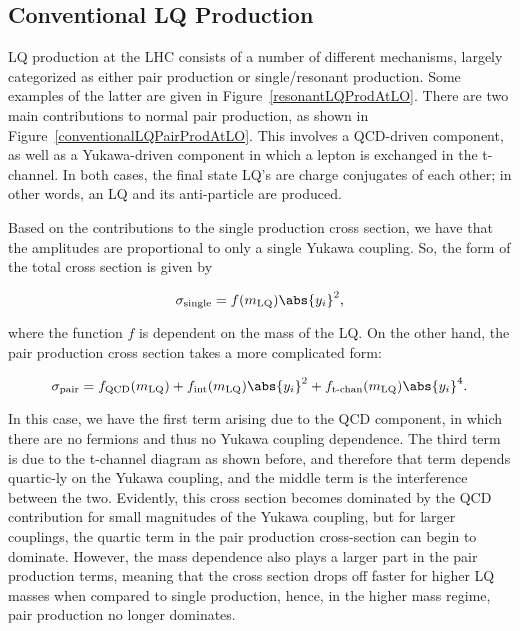     \subsection{Conventional LQ Production}

        

        LQ production at the LHC consists of a number of different mechanisms, largely categorized as either pair production or single/resonant production. Some examples of the latter are given in Figure~\ref{resonantLQProdAtLO}. There are two main contributions to normal pair production, as shown in Figure~\ref{conventionalLQPairProdAtLO}. This involves a QCD-driven component, as well as a Yukawa-driven component in which a lepton is exchanged in the t-channel. In both cases, the final state LQ's are charge conjugates of each other; in other words, an LQ and its anti-particle are produced. 

        

        Based on the contributions to the single production cross section, we have that the amplitudes are proportional to only a single Yukawa coupling. So, the form of the total cross section is given by

        \begin{equation}
            \sigma_{\text{single}} = f(m_{\text{LQ}}) \abs{y_i}^2,
        \end{equation}

        where the function $f$ is dependent on the mass of the LQ. On the other hand, the pair production cross section takes a more complicated form:

        \begin{equation}
            \sigma_{\text{pair}} = f_{\text{QCD}}(m_{\text{LQ}}) + f_{\text{int}}(m_{\text{LQ}}) \abs{y_i}^2 + f_{\text{t-chan}}(m_{\text{LQ}}) \abs{y_i}^4. 
        \end{equation}

        In this case, we have the first term arising due to the QCD component, in which there are no fermions and thus no Yukawa coupling dependence. The third term is due to the t-channel diagram as shown before, and therefore that term depends quartic-ly on the Yukawa coupling, and the middle term is the interference between the two. Evidently, this cross section becomes dominated by the QCD contribution for small magnitudes of the Yukawa coupling, but for larger couplings, the quartic term in the pair production cross-section can begin to dominate. However, the mass dependence also plays a larger part in the pair production terms, meaning that the cross section drops off faster for higher LQ masses when compared to single production, hence, in the higher mass regime, pair production no longer dominates.
